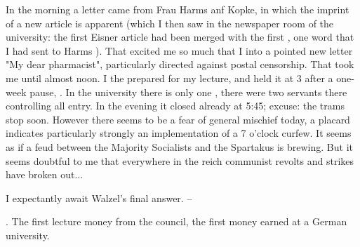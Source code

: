 
In the morning a letter came from Frau Harms anf Kopke, in which the imprint of a new article is apparent (which I then saw in the newspaper room of the university: the first Eisner article had been merged with the first , one word that I had sent to Harms ). That excited me so much that I  into a pointed new letter "My dear pharmacist", particularly directed against postal censorship. That took me until almost noon. I the prepared for my lecture, and held it at 3 after a one-week pause, . In the university there is only one , there were two servants there controlling all entry. In the evening it closed already at 5:45; excuse: the trams stop soon. However there seems to be a fear of general mischief today, a placard indicates particularly strongly an implementation of a 7 o'clock curfew. It seems as if a feud between the Majority Socialists and the Spartakus is brewing. But it seems doubtful to me that everywhere in the reich communist revolts and strikes have broken out... \missing

I expectantly await Walzel's final answer. --

. The first lecture money from the council, the first money earned at a German university.

